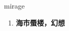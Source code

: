 
\begin{frame}
{\huge mirage}
\begin{center}
\begin{enumerate}\Large
  \item \textbf{海市蜃楼，幻想}
\end{enumerate}
\end{center}
\end{frame}
